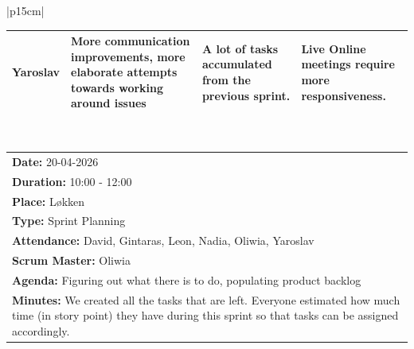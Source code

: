 \begin{table}[H]
    \centering
    \begin{tabular}{|p{15cm}|} 
        \hline
        \begin{table}[H]
            \begin{tabular}{|p{1.75cm}|p{4cm}|p{4cm}|p{4cm}|}
                \hline
                \cellcolor[HTML]{d4d4d4} Yaroslav & More communication improvements, more elaborate attempts towards working around issues & A lot of tasks accumulated from the previous sprint. & Live Online meetings require more responsiveness. \\
                \hline
            \end{tabular}
        \end{table}
        \\
        \hline
    \end{tabular}
\end{table}

\begin{table}[H]
    \centering
    \begin{tabular}{|p{15cm}|}   
        \hline
        \textbf{Date:}  20-04-2026 \\
        \textbf{Duration:} 10:00 - 12:00 \\
        \textbf{Place:}  Løkken \\
        \textbf{Type:} Sprint Planning \\
        \textbf{Attendance:} David, Gintaras, Leon, Nadia, Oliwia, Yaroslav \\
        \textbf{Scrum Master:} Oliwia  \\
        \textbf{Agenda:} Figuring out what there is to do, populating product backlog \\
        \textbf{Minutes:} We created all the tasks that are left. Everyone estimated how much time (in story point) they have during this sprint so that tasks can be assigned accordingly.  \\
        \hline
    \end{tabular}
\end{table}

